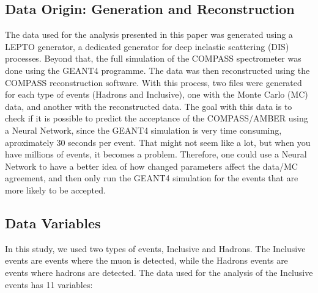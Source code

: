 \documentclass[EPJ,twocolumn]{webofc}
\begin{document}
\subsection{Data Origin: Generation and Reconstruction}
The data used for the analysis presented in this paper was generated using a LEPTO generator,
a dedicated generator for deep inelastic scattering (DIS) processes. Beyond that, the full simulation
of the COMPASS spectrometer was done using the GEANT4 programme. The data was then reconstructed
using the COMPASS reconstruction software. With this process, two files were generated for each type of events (Hadrons and Inclusive), one with the
Monte Carlo (MC) data, and another with the reconstructed data. 
The goal with this data is to check if it is possible to predict the acceptance of the COMPASS/AMBER
using a Neural Network, since the GEANT4 simulation is very time consuming, aproximately 30 seconds per event.
That might not seem like a lot, but when you have millions of events, it becomes a problem.
Therefore, one could use a Neural Network to have a better idea of how changed parameters affect the data/MC
agreement, and then only run the GEANT4 simulation for the events that are more likely to be accepted.


\subsection{Data Variables}
In this study, we used two types of events, Inclusive and Hadrons. The Inclusive events are events where the muon is detected, while the Hadrons events are events where hadrons are detected.
The data used for the analysis of the Inclusive events has 11 variables:

\begin{table}[H]
    \centering
\end{table}
\end{document}
